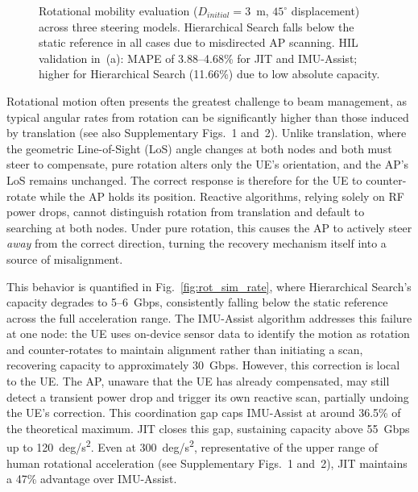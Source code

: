 \documentclass[fleqn,10pt]{wlscirep}
\newcommand{\legmark}[2]{%
    \tikz[baseline=-0.5ex]{
        \node[#2, fill=#1, draw=#1, inner sep=2pt, scale=0.8] at (0,0) {};
    }%
}
\begin{document}
\begin{figure}[ht!]
    \caption{Rotational mobility evaluation ($D_{initial} = 3$~m, $45^\circ$ displacement) across three steering models. Hierarchical Search falls below the static reference in all cases due to misdirected AP scanning. HIL validation in~(a): MAPE of 3.88--4.68\% for JIT and IMU-Assist; higher for Hierarchical Search (11.66\%) due to low absolute capacity.}
    \label{fig:rotational_rate}
    \vspace{-5pt}
\end{figure}

Rotational motion often presents the greatest challenge to beam management, as typical angular rates from rotation can be significantly higher than those induced by translation\cite{9391649} (see also Supplementary Figs.~1 and~2). Unlike translation, where the geometric Line-of-Sight (LoS) angle changes at both nodes and both must steer to compensate, pure rotation alters only the UE's orientation, and the AP's LoS remains unchanged. The correct response is therefore for the UE to counter-rotate while the AP holds its position. Reactive algorithms, relying solely on RF power drops, cannot distinguish rotation from translation and default to searching at both nodes. Under pure rotation, this causes the AP to actively steer \emph{away} from the correct direction, turning the recovery mechanism itself into a source of misalignment.

This behavior is quantified in Fig.~\ref{fig:rot_sim_rate}, where Hierarchical Search's capacity degrades to \SI{5}{}--\SI{6}{Gbps}, consistently falling below the static reference across the full acceleration range. The IMU-Assist algorithm addresses this failure at one node: the UE uses on-device sensor data to identify the motion as rotation and counter-rotates to maintain alignment rather than initiating a scan, recovering capacity to approximately \SI{30}{Gbps}. However, this correction is local to the UE. The AP, unaware that the UE has already compensated, may still detect a transient power drop and trigger its own reactive scan, partially undoing the UE's correction. This coordination gap caps IMU-Assist at around 36.5\% of the theoretical maximum. JIT closes this gap, sustaining capacity above \SI{55}{Gbps} up to \SI{120}{deg/s^2}. Even at \SI{300}{deg/s^2}, representative of the upper range of human rotational acceleration (see Supplementary Figs.~1 and~2), JIT maintains a 47\% advantage over IMU-Assist.
\end{document}
